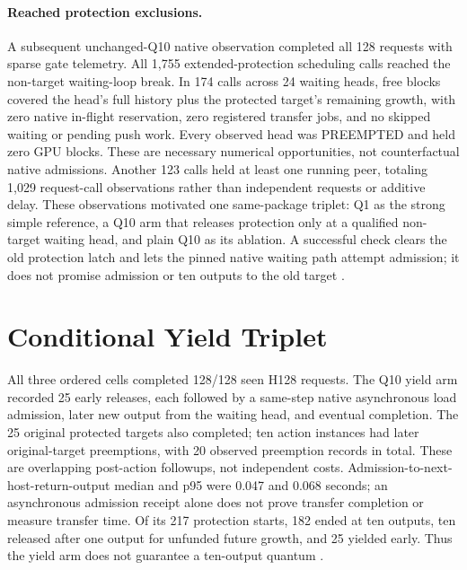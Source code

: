 \documentclass[10pt]{article}
\begin{document}
\paragraph{Reached protection exclusions.}
A subsequent unchanged-Q10 native observation completed all 128 requests with sparse gate telemetry. All 1,755 extended-protection scheduling calls reached the non-target waiting-loop break. In 174 calls across 24 waiting heads, free blocks covered the head's full history plus the protected target's remaining growth, with zero native in-flight reservation, zero registered transfer jobs, and no skipped waiting or pending push work. Every observed head was PREEMPTED and held zero GPU blocks. These are necessary numerical opportunities, not counterfactual native admissions. Another 123 calls held at least one running peer, totaling 1,029 request-call observations rather than independent requests or additive delay. These observations motivated one same-package triplet: Q1 as the strong simple reference, a Q10 arm that releases protection only at a qualified non-target waiting head, and plain Q10 as its ablation. A successful check clears the old protection latch and lets the pinned native waiting path attempt admission; it does not promise admission or ten outputs to the old target \cite{protectionscope,yieldtriplet}.

\section{Conditional Yield Triplet}
All three ordered cells completed 128/128 seen H128 requests. The Q10 yield arm recorded 25 early releases, each followed by a same-step native asynchronous load admission, later new output from the waiting head, and eventual completion. The 25 original protected targets also completed; ten action instances had later original-target preemptions, with 20 observed preemption records in total. These are overlapping post-action followups, not independent costs. Admission-to-next-host-return-output median and p95 were 0.047 and 0.068 seconds; an asynchronous admission receipt alone does not prove transfer completion or measure transfer time. Of its 217 protection starts, 182 ended at ten outputs, ten released after one output for unfunded future growth, and 25 yielded early. Thus the yield arm does not guarantee a ten-output quantum \cite{yieldtriplet}.
\end{document}
